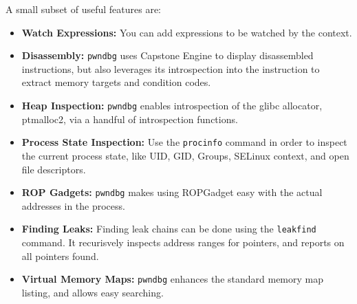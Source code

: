 \documentclass{article}
\begin{document}
A small subset of useful features are:
\begin{itemize}
\item{\textbf{Watch Expressions:}} You can add expressions to be watched by the context.
\item{\textbf{Disassembly:}} \texttt{pwndbg} uses Capstone Engine to display disassembled instructions, but also 
leverages its introspection into the instruction to extract memory targets and condition codes.
\item{\textbf{Heap Inspection:}} \texttt{pwndbg} enables introspection of the glibc allocator, ptmalloc2, via a 
handful of introspection functions.
\item{\textbf{Process State Inspection:}} Use the \texttt{procinfo} command in order to inspect the current process state, 
like UID, GID, Groups, SELinux context, and open file descriptors.
\item{\textbf{ROP Gadgets:}} \texttt{pwndbg} makes using ROPGadget easy with the actual addresses in the process.
\item{\textbf{Finding Leaks:}} Finding leak chains can be done using the \texttt{leakfind} command. It recurisvely 
inspects address ranges for pointers, and reports on all pointers found.
\item{\textbf{Virtual Memory Maps:}} \texttt{pwndbg} enhances the standard memory map listing, and allows easy searching.
\end{itemize}
\end{document}
